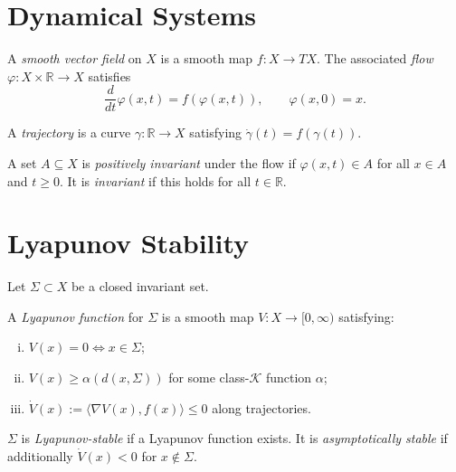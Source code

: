 \documentclass[11pt,openany]{book}
\begin{document}
\section{Dynamical Systems}
\label{sec:dynamical-systems}

\begin{definition}
A \emph{smooth vector field} on $X$ is a smooth map
$f : X \to TX$.  The associated \emph{flow}
$\varphi : X \times \mathbb{R} \to X$ satisfies
\[
  \frac{d}{dt}\varphi(x,t) = f(\varphi(x,t)),
  \qquad \varphi(x,0) = x.
\]
\end{definition}

\begin{definition}[Trajectory]
A \emph{trajectory} is a curve $\gamma : \mathbb{R} \to X$
satisfying $\dot\gamma(t) = f(\gamma(t))$.
\end{definition}

\begin{definition}
A set $A \subseteq X$ is \emph{positively invariant} under
the flow if $\varphi(x,t) \in A$ for all $x \in A$ and
$t \ge 0$.  It is \emph{invariant} if this holds for all
$t \in \mathbb{R}$.
\end{definition}

\section{Lyapunov Stability}
\label{sec:lyapunov_c}

Let $\Sigma \subset X$ be a closed invariant set.

\begin{definition}
A \emph{Lyapunov function} for $\Sigma$ is a smooth map
$V : X \to [0,\infty)$ satisfying:
\begin{enumerate}[(i)]
  \item $V(x) = 0 \iff x \in \Sigma$;
  \item $V(x) \ge \alpha(d(x,\Sigma))$ for some
    class-$\mathcal{K}$ function $\alpha$;
  \item $\dot{V}(x) := \langle \nabla V(x), f(x)\rangle
    \le 0$ along trajectories.
\end{enumerate}
\end{definition}

\begin{definition}
$\Sigma$ is \emph{Lyapunov-stable} if a Lyapunov function
exists.  It is \emph{asymptotically stable} if additionally
$\dot{V}(x) < 0$ for $x \notin \Sigma$.
\end{definition}
\end{document}
